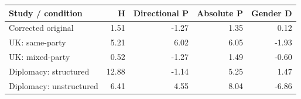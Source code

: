 
\begin{tabular}{lrrrr}
\toprule
Study / condition & H & Directional P & Absolute P & Gender D\\
\midrule
Corrected original & 1.51 & -1.27 & 1.35 & 0.12\\
UK: same-party & 5.21 & 6.02 & 6.05 & -1.93\\
UK: mixed-party & 0.52 & -1.27 & 1.49 & -0.60\\
Diplomacy: structured & 12.88 & -1.14 & 5.25 & 1.47\\
Diplomacy: unstructured & 6.41 & 4.55 & 8.04 & -6.86\\
\bottomrule
\end{tabular}
